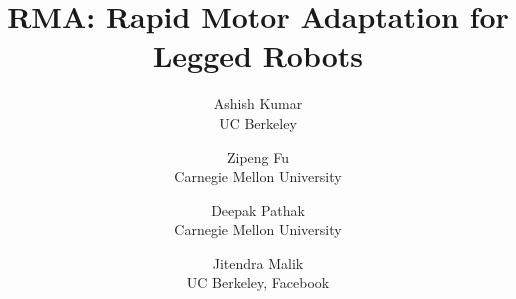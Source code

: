 \documentclass[conference]{IEEEtran}
\date{}
\begin{document}
\title{RMA: Rapid Motor Adaptation for Legged Robots}


\author{Ashish Kumar\\
UC Berkeley
\and
Zipeng Fu\\
Carnegie Mellon University
\and
Deepak Pathak\\
Carnegie Mellon University
\and
Jitendra Malik\\
UC Berkeley, Facebook
}





% 
\end{document}
